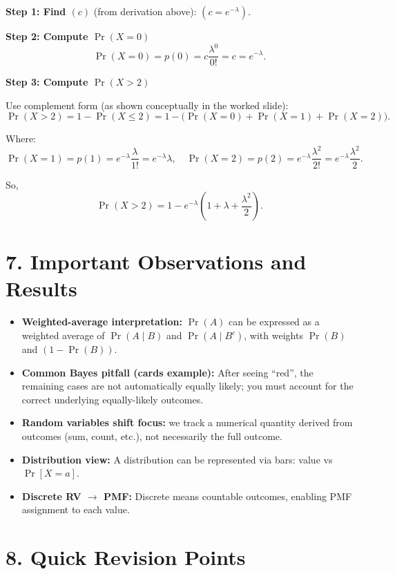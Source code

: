 \documentclass[11pt]{article}
\begin{document}
\textbf{Step 1: Find $(c)$} (from derivation above): $(c=e^{-\lambda})$.

\textbf{Step 2: Compute $\Pr(X=0)$}
\[
\Pr(X=0)=p(0)=c\frac{\lambda^0}{0!}=c=e^{-\lambda}.
\]

\textbf{Step 3: Compute $\Pr(X>2)$}

Use complement form (as shown conceptually in the worked slide):
\[
\Pr(X>2)=1-\Pr(X\le 2)=1-\bigl(\Pr(X=0)+\Pr(X=1)+\Pr(X=2)\bigr).
\]

Where:
\[
\Pr(X=1)=p(1)=e^{-\lambda}\frac{\lambda}{1!}=e^{-\lambda}\lambda,\quad
\Pr(X=2)=p(2)=e^{-\lambda}\frac{\lambda^2}{2!}=e^{-\lambda}\frac{\lambda^2}{2}.
\]

So,
\[
\boxed{\Pr(X>2)=1-e^{-\lambda}\left(1+\lambda+\frac{\lambda^2}{2}\right)}.
\]

\vspace{1cm}
\section*{7. Important Observations and Results}

\begin{itemize}
\item \textbf{Weighted-average interpretation:} $\Pr(A)$ can be expressed as a weighted average of $\Pr(A\mid B)$ and $\Pr(A\mid B^c)$, with weights $\Pr(B)$ and $(1-\Pr(B))$.
\item \textbf{Common Bayes pitfall (cards example):} After seeing “red”, the remaining cases are not automatically equally likely; you must account for the correct underlying equally-likely outcomes.
\item \textbf{Random variables shift focus:} we track a numerical quantity derived from outcomes (sum, count, etc.), not necessarily the full outcome.
\item \textbf{Distribution view:} A distribution can be represented via bars: value vs $\Pr[X=a]$.
\item \textbf{Discrete RV $\rightarrow$ PMF:} Discrete means countable outcomes, enabling PMF assignment to each value.
\end{itemize}

\vspace{1cm}
\section*{8. Quick Revision Points}
\end{document}
